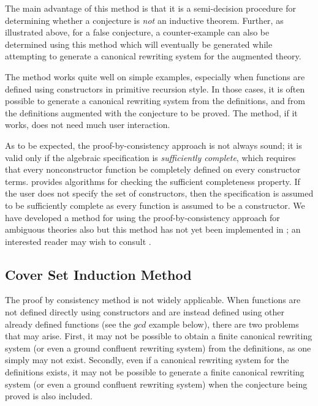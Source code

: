 The main advantage of this method is that it is a semi-decision procedure
for determining whether a conjecture is {\sl not} an inductive theorem.
Further, as illustrated above, for a false conjecture, a
counter-example can also be determined using this method which
will eventually be generated while
attempting to generate a canonical rewriting system for the augmented
theory.

The method works quite well on simple examples, especially when
functions are defined using constructors in primitive recursion style.
In those cases, it is often possible to generate a canonical rewriting
system from the definitions, and from the definitions augmented
with the conjecture to be proved. The method, if it works, does not
need much user interaction.

As to be expected, the proof-by-consistency approach is not always
sound; it is valid only if the algebraic specification is {\em
sufficiently complete}, which requires that every nonconstructor
function be completely defined on every constructor terms.
\RRL provides algorithms for checking the sufficient completeness property.
If the user does not specify the set of constructors, then the
specification is assumed to be sufficiently complete as every function
is assumed to be a constructor.  We have developed a method for using
the proof-by-consistency approach for ambiguous theories also but this
method has not yet been implemented in
\ERRL; an interested reader may wish to consult \cite{KapurMusser84}.

\subsection{Cover Set Induction Method}

The proof by consistency method is not widely applicable. When
functions are not defined directly using constructors and are instead
defined using other already defined functions (see the ${gcd}$ example
below), there are two problems that may arise.  First, it may not be
possible to obtain a finite canonical rewriting system (or even a
ground confluent rewriting system) from the definitions, as one simply
may not exist.  Secondly, even if a canonical rewriting system for the
definitions exists, it may not be possible to generate a finite
canonical rewriting system (or even a ground confluent rewriting
system) when the conjecture being proved is also included.

